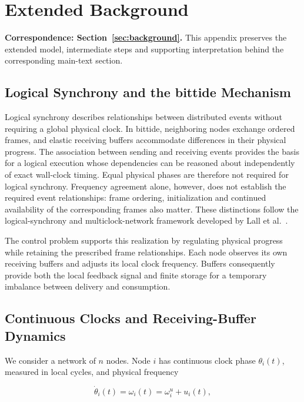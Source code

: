\section{Extended Background}
\label{app:background}
\noindent\textbf{Correspondence: Section~\ref{sec:background}.} This appendix preserves the extended model, intermediate steps and supporting interpretation behind the corresponding main-text section.


\label{detail:sec:background}

\subsection{Logical Synchrony and the bittide Mechanism}

Logical synchrony describes relationships between distributed events without requiring a global physical clock. In bittide, neighboring nodes exchange ordered frames, and elastic receiving buffers accommodate differences in their physical progress. The association between sending and receiving events provides the basis for a logical execution whose dependencies can be reasoned about independently of exact wall-clock timing. Equal physical phases are therefore not required for logical synchrony. Frequency agreement alone, however, does not establish the required event relationships: frame ordering, initialization and continued availability of the corresponding frames also matter. These distinctions follow the logical-synchrony and multiclock-network framework developed by Lall et al.~\cite{lall2024logicalSynchrony}.

The control problem supports this realization by regulating physical progress while retaining the prescribed frame relationships. Each node observes its own receiving buffers and adjusts its local clock frequency. Buffers consequently provide both the local feedback signal and finite storage for a temporary imbalance between delivery and consumption.

\subsection{Continuous Clocks and Receiving-Buffer Dynamics}

We consider a network of $n$ nodes. Node $i$ has continuous clock phase $\theta_i(t)$, measured in local cycles, and physical frequency

\begin{equation}
\dot\theta_i(t)=\omega_i(t)=\omega_i^u+u_i(t),
\end{equation}

